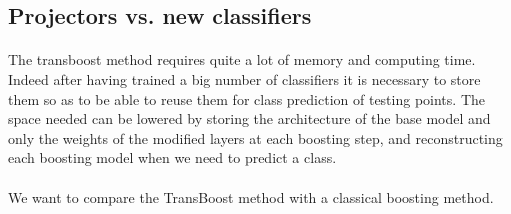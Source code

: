 \documentclass[11 pt]{article}
\begin{document}
\subsection{Projectors vs. new classifiers}

\paragraph{}The transboost method requires quite a lot of memory and computing time. Indeed after having trained a big number of classifiers it is necessary to store them so as to be able to reuse them for class prediction of testing points. The space needed can be lowered by storing the architecture of the base model and only the weights of the modified layers at each boosting step, and reconstructing each boosting model when we need to predict a class.

\paragraph{}We want to compare the TransBoost method with a classical boosting method. 

\end{document}
